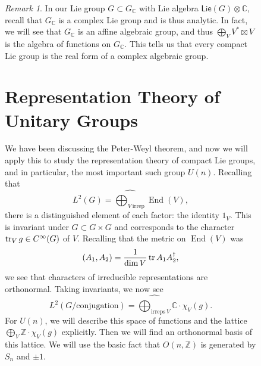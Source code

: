 \documentclass[leqno, openany]{memoir}
\theoremstyle{definition}
\theoremstyle{remark}
\newtheorem{rmk}[thm]{Remark}
\theoremstyle{plain}
\theoremstyle{definition}
\theoremstyle{remark}
\newcommand{\C}{\mathbb{C}}
\newcommand{\Z}{\mathbb{Z}}
\newcommand{\ms}[1]{\mathsf{#1}}
\newcommand{\wh}[1]{\widehat{#1}}
\DeclareMathOperator{\End}{End}
\begin{document}
\begin{figure}[H]
\begin{rmk}
    In our Lie group $G \subset G_{\C}$ with Lie algebra $\ms{Lie}(G) \otimes
\C$, recall that $G_{\C}$ is a complex Lie group and is thus analytic. In fact,
we will see that $G_{\C}$ is an affine algebraic group, and thus $\bigoplus_V
V^* \boxtimes V$ is the algebra of functions on $G_{\C}$. This tells us that
every compact Lie group is the real form of a complex algebraic group.
\end{rmk}

\section{Representation Theory of Unitary Groups}%
\label{sec:representation_theory_of_unitary_groups}

We have been discussing the Peter-Weyl theorem, and now we will apply this to
study the representation theory of compact Lie groups, and in particular, the
most important such group $U(n)$. Recalling that \[ L^2(G) = \wh{\bigoplus_{V\
\text{irrep}}} \End(V), \] there is a distinguished element of each factor: the
identity $1_V$. This is invariant under $G \subset G \times G$ and corresponds
to the character $\tr_V g \in C^{\infty}(G)$ of $V$. Recalling that the metric
on $\End(V)$ was \[ (A_1, A_2) = \frac{1}{\dim V} \tr A_1 A_2^{\dag}, \] we see
that characters of irreducible representations are orthonormal. Taking
invariants, we now see \[ L^2(G/\text{conjugation}) =
\wh{\bigoplus_{\text{irreps}\ V}} \C \cdot \chi_V(g). \] For $U(n)$, we will
describe this space of functions and the lattice $\bigoplus_V \Z \cdot
\chi_V(g)$ explicitly. Then we will find an orthonormal basis of this lattice.
We will use the basic fact that $O(n, \Z)$ is generated by $S_n$ and $\pm 1$.


\end{figure}
\end{document}
